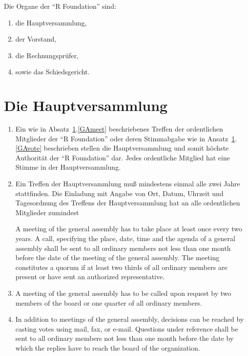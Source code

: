 \documentclass[a4paper]{article}
\newcommand{\RF}{"`R Foundation"'}
\begin{document}
Die Organe der \RF{} sind:
\begin{enumerate}
 \item die Hauptversammlung,
 \item der Vorstand,
 \item die Rechnungspr{\"u}fer,
 \item sowie das Schiedsgericht.
\end{enumerate}


\section{Die Hauptversammlung}
\label{GA}


\begin{enumerate}
 \item Ein wie in Absatz~\ref{GA}.\ref{GAmeet} beschriebenes Treffen
  der ordentlichen Mitglieder der \RF{} oder deren Stimmabgabe wie in
  Ansatz~\ref{GA}.\ref{GAvote} beschrieben stellen die
  Hauptversammlung und somit h{\"o}chste Authorit{\"a}t der \RF{} dar. Jedes
  ordentliche Mitglied hat eine Stimme in der Hauptversammlung.
  
 \item \label{GAmeet}
  Ein Treffen der Hauptversammlung mu{\ss} mindestens einmal alle zwei
  Jahre stattfinden. Die Einladung mit Angabe von Ort, Datum, Uhrzeit
  und Tagesordnung des Treffens der Hauptversammlung hat an alle
  ordentlichen Mitglieder zumindest 
  
  A meeting of the general assembly has to take place at least
  once every two years. A call, specifying the place, date, time and
  the agenda of a general assembly shall be sent to all ordinary
  members not less than one month before the date of the meeting of
  the general assembly. The meeting constitutes a quorum if at least
  two thirds of all ordinary members are present or have sent an
  authorized representative.
  
 \item A meeting of the general assembly has to be called upon request
  by two members of the board or one quarter of all ordinary members. 
  
  \item \label{GAvote}
   In addition to meetings of the general assembly, decisions can
  be reached by casting votes using mail, fax, or e-mail. Questions
  under reference shall be sent to all ordinary members not less than
  one month before the date by which the replies have to reach the
  board of the organization.
  

\end{enumerate}
\end{document}
